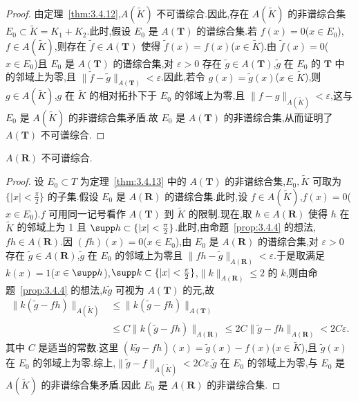 \begin{proof}
由定理~\ref{thm:3.4.12},$A(\widetilde{K})$ 不可谱综合.因此,存在 $A(\widetilde{K})$ 的非谱综合集 $E_{0} \subset \widetilde{K} = K_{1} + K_{2}$.此时,假设 $E_{0}$ 是 $A(\mathbf{T})$ 的谱综合集.若 $f(x) = 0$($x \in E_{0}$),$f \in A(\widetilde{K})$,则存在 $\widetilde{f} \in A(\mathbf{T})$ 使得 $\widetilde{f}(x) = f(x)$($x \in \widetilde{K}$).由 $\widetilde{f}(x) = 0$($x \in E_{0}$)且 $E_{0}$ 是 $A(\mathbf{T})$ 的谱综合集,对 $\varepsilon > 0$ 存在 $\widetilde{g} \in A(\mathbf{T})$,$\widetilde{g}$ 在 $E_{0}$ 的 $\mathbf{T}$ 中的邻域上为零,且 $\|\widetilde{f} - \widetilde{g}\|_{A(\mathbf{T})} < \varepsilon$.因此,若令 $g(x) = \widetilde{g}(x)$($x \in \widetilde{K}$),则 $g \in A(\widetilde{K})$,$g$ 在 $\widetilde{K}$ 的相对拓扑下于 $E_{0}$ 的邻域上为零,且 $\|f - g\|_{A(\widetilde{K})} < \varepsilon$,这与 $E_{0}$ 是 $A(\widetilde{K})$ 的非谱综合集矛盾.故 $E_{0}$ 是 $A(\mathbf{T})$ 的非谱综合集,从而证明了 $A(\mathbf{T})$ 不可谱综合.
\end{proof}

\begin{theorem}\label{thm:3.4.14}
$A(\mathbf{R})$ 不可谱综合.
\end{theorem}

\begin{proof}
设 $E_{0} \subset T$ 为定理~\ref{thm:3.4.13} 中的 $A(\mathbf{T})$ 的非谱综合集,$E_{0}, \widetilde{K}$ 可取为 $\{|x| < \frac{\pi}{2}\}$ 的子集.假设 $E_{0}$ 是 $A(\mathbf{R})$ 的谱综合集.此时,设 $f \in A(\widetilde{K})$,$f(x) = 0$($x \in E_{0}$).$f$ 可用同一记号看作 $A(\mathbf{T})$ 到 $\widetilde{K}$ 的限制.现在,取 $h \in A(\mathbf{R})$ 使得 $h$ 在 $\widetilde{K}$ 的邻域上为 1 且 $\supp h \subset \{|x| < \frac{\pi}{2}\}$.此时,由命题~\ref{prop:3.4.4} 的想法,$fh \in A(\mathbf{R})$.因 $(fh)(x) = 0$($x \in E_{0}$),由 $E_{0}$ 是 $A(\mathbf{R})$ 的谱综合集,对 $\varepsilon > 0$ 存在 $\widetilde{g} \in A(\mathbf{R})$,$\widetilde{g}$ 在 $E_{0}$ 的邻域上为零且 $\|fh - \widetilde{g}\|_{A(\mathbf{R})} < \varepsilon$.于是取满足 $k(x) = 1$($x \in \supp h$),$\supp k \subset \{|x| < \frac{\pi}{2}\}$,$\|k\|_{A(\mathbf{R})} \leq 2$ 的 $k$,则由命题~\ref{prop:3.4.4} 的想法,$k\widetilde{g}$ 可视为 $A(\mathbf{T})$ 的元,故
\begin{align*}
\|k(\widetilde{g} - fh)\|_{A(\widetilde{K})} &\leq \|k(\widetilde{g} - fh)\|_{A(\mathbf{T})}\\
&\leq C\|k(\widetilde{g} - fh)\|_{A(\mathbf{R})} \leq 2C\|\widetilde{g} - fh\|_{A(\mathbf{R})} < 2C\varepsilon.
\end{align*}
其中 $C$ 是适当的常数.这里 $(k\widetilde{g} - fh)(x) = \widetilde{g}(x) - f(x)$($x \in \widetilde{K}$),且 $\widetilde{g}(x)$ 在 $E_{0}$ 的邻域上为零.综上,$\|\widetilde{g} - f\|_{A(\widetilde{K})} < 2C\varepsilon$,$\widetilde{g}$ 在 $E_{0}$ 的邻域上为零,与 $E_{0}$ 是 $A(\widetilde{K})$ 的非谱综合集矛盾.因此 $E_{0}$ 是 $A(\mathbf{R})$ 的非谱综合集.
\end{proof}

